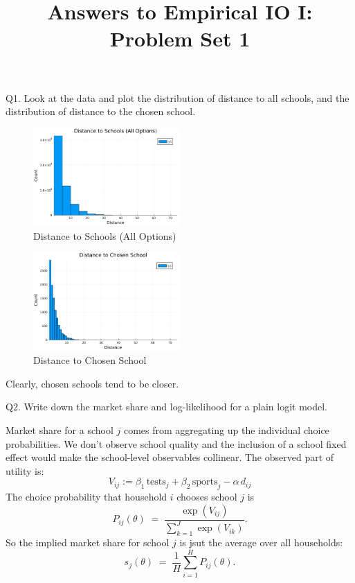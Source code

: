 \documentclass{article}
\begin{document}
\title{Answers to Empirical IO I: Problem Set 1}
\author{}
\date{}
\maketitle

\begin{tcolorbox}
Q1. Look at the data and plot the distribution of distance to all schools, and the distribution of distance to the chosen school.
\end{tcolorbox}

\begin{figure}[H]
    \centering
    \includegraphics[width=0.5\textwidth]{outputs/Q1_dist_all.png}
    \caption{Distance to Schools (All Options)}
\end{figure}

\begin{figure}[H]
    \centering
    \includegraphics[width=0.5\textwidth]{outputs/Q1_dist_chosen.png}
    \caption{Distance to Chosen School}
\end{figure}

\vspace{5mm}

Clearly, chosen schools tend to be closer.
\begin{tcolorbox}
Q2. Write down the market share and log-likelihood for a plain logit model.
\end{tcolorbox}

Market share for a school $j$ comes from aggregating up the individual choice probabilities. We don't observe school quality and the inclusion of a school fixed effect would make the school-level observables collinear. The observed part of utility is:
\[
V_{ij} := \beta_1 \,\text{tests}_j + \beta_2 \,\text{sports}_j - \alpha \, d_{ij}
\]
The choice probability that household $i$ chooses school $j$ is
\[
P_{ij}(\theta) \;=\; \frac{\exp(V_{ij})}{\sum_{k=1}^J \exp(V_{ik})}.
\]
So the implied market share for school $j$ is jsut the average over all households:
\[
s_j(\theta) \;=\; \frac{1}{H} \sum_{i=1}^H P_{ij}(\theta).
\]
\end{document}
